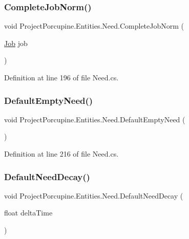 \subsubsection{\texorpdfstring{Complete\+Job\+Norm()}{CompleteJobNorm()}}
{\footnotesize\ttfamily void Project\+Porcupine.\+Entities.\+Need.\+Complete\+Job\+Norm (\begin{DoxyParamCaption}\item[{\hyperlink{class_job}{Job}}]{job }\end{DoxyParamCaption})}



Definition at line 196 of file Need.\+cs.

\mbox{\label{class_project_porcupine_1_1_entities_1_1_need_ae479726245e39ddd70ccd7236839a39c}} 
\subsubsection{\texorpdfstring{Default\+Empty\+Need()}{DefaultEmptyNeed()}}
{\footnotesize\ttfamily void Project\+Porcupine.\+Entities.\+Need.\+Default\+Empty\+Need (\begin{DoxyParamCaption}{ }\end{DoxyParamCaption})}



Definition at line 216 of file Need.\+cs.

\mbox{\label{class_project_porcupine_1_1_entities_1_1_need_a2a175d9f075fcdefa0254553cf8d178e}} 
\subsubsection{\texorpdfstring{Default\+Need\+Decay()}{DefaultNeedDecay()}}
{\footnotesize\ttfamily void Project\+Porcupine.\+Entities.\+Need.\+Default\+Need\+Decay (\begin{DoxyParamCaption}\item[{float}]{delta\+Time }\end{DoxyParamCaption})}



